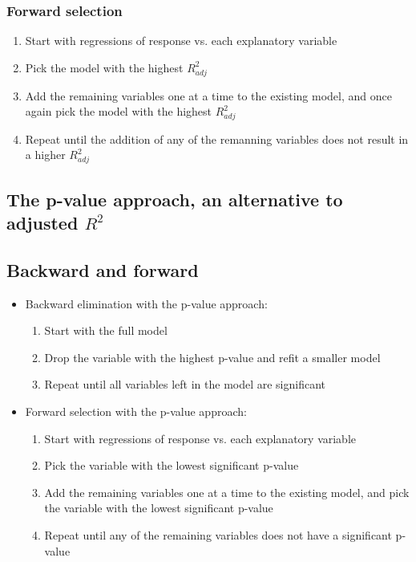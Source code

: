 
\begin{frame}
\frametitle{Forward selection}

\begin{enumerate}

\item Start with regressions of response vs. each explanatory variable
\item Pick the model with the highest $R^2_{adj}$
\item Add the remaining variables one at a time to the existing model, and once again pick the model  with the highest $R^2_{adj}$
\item Repeat until the addition of any of the remanning variables does not result in a higher $R^2_{adj}$

\end{enumerate}

\end{frame}


\subsection{The p-value approach, an alternative to adjusted $R^2$}


\begin{frame}
\subsection{Backward and forward}

\begin{itemize}

\item Backward elimination with the p-value approach: 
\begin{enumerate}
\item Start with the full model
\item Drop the variable with the highest p-value and refit a smaller model
\item Repeat until all variables left in the model are significant
\end{enumerate}

\item Forward selection with the p-value approach: 
\begin{enumerate}
\item Start with regressions of response vs. each explanatory variable
\item Pick the variable with the lowest significant p-value 
\item Add the remaining variables one at a time to the existing model, and pick the variable with the lowest significant p-value
\item Repeat until any of the remaining variables does not have a significant p-value
\end{enumerate}

\end{itemize}

\end{frame}

